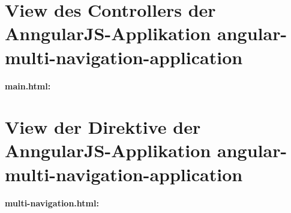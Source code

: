 \section*{View des Controllers der AnngularJS-Applikation angular-multi-navigation-application}\label{view-des-controllers-der-angular-multi-navigation-application}

\textbf{main.html:}

\begin{Shaded}
\begin{Highlighting}[]
\KeywordTok{>}
  \KeywordTok{>}
    \KeywordTok{>}
\end{Highlighting}
\end{Shaded}

\section*{View der Direktive der AnngularJS-Applikation angular-multi-navigation-application}\label{view-der-direktive-der-angular-multi-navigation-application}

\textbf{multi-navigation.html:}

